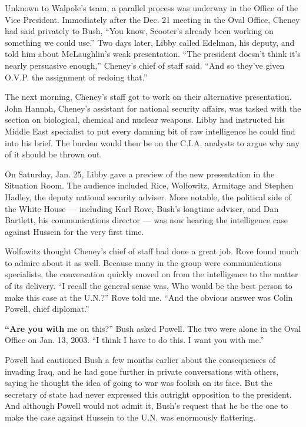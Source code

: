 Unknown to Walpole's team, a parallel process was underway in the Office
of the Vice President. Immediately after the Dec. 21 meeting in the Oval
Office, Cheney had said privately to Bush, ``You know, Scooter's already
been working on something we could use.'' Two days later, Libby called
Edelman, his deputy, and told him about McLaughlin's weak presentation.
``The president doesn't think it's nearly persuasive enough,'' Cheney's
chief of staff said. ``And so they've given O.V.P. the assignment of
redoing that.''

The next morning, Cheney's staff got to work on their alternative
presentation. John Hannah, Cheney's assistant for national security
affairs, was tasked with the section on biological, chemical and nuclear
weapons. Libby had instructed his Middle East specialist to put every
damning bit of raw intelligence he could find into his brief. The burden
would then be on the C.I.A. analysts to argue why any of it should be
thrown out.

On Saturday, Jan. 25, Libby gave a preview of the new presentation in
the Situation Room. The audience included Rice, Wolfowitz, Armitage and
Stephen Hadley, the deputy national security adviser. More notable, the
political side of the White House --- including Karl Rove, Bush's
longtime adviser, and Dan Bartlett, his communications director --- was
now hearing the intelligence case against Hussein for the very first
time.

Wolfowitz thought Cheney's chief of staff had done a great job. Rove
found much to admire about it as well. Because many in the group were
communications specialists, the conversation quickly moved on from the
intelligence to the matter of its delivery. ``I recall the general sense
was, Who would be the best person to make this case at the U.N.?'' Rove
told me. ``And the obvious answer was Colin Powell, chief diplomat.''

\textbf{``Are you with} me on this?'' Bush asked Powell. The two were
alone in the Oval Office on Jan. 13, 2003. ``I think I have to do this.
I want you with me.''

Powell had cautioned Bush a few months earlier about the consequences of
invading Iraq, and he had gone further in private conversations with
others, saying he thought the idea of going to war was foolish on its
face. But the secretary of state had never expressed this outright
opposition to the president. And although Powell would not admit it,
Bush's request that he be the one to make the case against Hussein to
the U.N. was enormously flattering.

